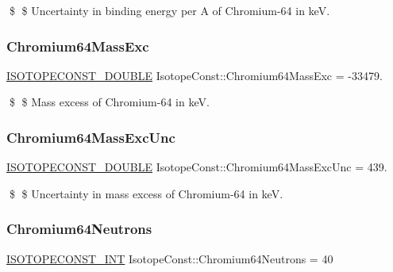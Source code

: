 \$ \$ Uncertainty in binding energy per A of Chromium-\/64 in keV. \mbox{\label{group___isotope_const-_chromium-_cr64_gafe8a8f8202820bf748d16053790a9ca7}} 
\subsubsection{\texorpdfstring{Chromium64\+Mass\+Exc}{Chromium64MassExc}}
{\footnotesize\ttfamily \mbox{\hyperlink{group___isotope_const-_macros_ga8f45a7272ce02c0b4c65c44636ed719a}{I\+S\+O\+T\+O\+P\+E\+C\+O\+N\+S\+T\+\_\+\+D\+O\+U\+B\+LE}} Isotope\+Const\+::\+Chromium64\+Mass\+Exc = -\/33479.}

\$ \$ Mass excess of Chromium-\/64 in keV. \mbox{\label{group___isotope_const-_chromium-_cr64_ga1cd9ef8ffc20773e980f1c568e1cb2d1}} 
\subsubsection{\texorpdfstring{Chromium64\+Mass\+Exc\+Unc}{Chromium64MassExcUnc}}
{\footnotesize\ttfamily \mbox{\hyperlink{group___isotope_const-_macros_ga8f45a7272ce02c0b4c65c44636ed719a}{I\+S\+O\+T\+O\+P\+E\+C\+O\+N\+S\+T\+\_\+\+D\+O\+U\+B\+LE}} Isotope\+Const\+::\+Chromium64\+Mass\+Exc\+Unc = 439.}

\$ \$ Uncertainty in mass excess of Chromium-\/64 in keV. \mbox{\label{group___isotope_const-_chromium-_cr64_ga542cabddc1bf898cc0a3522ef904f6ff}} 
\subsubsection{\texorpdfstring{Chromium64\+Neutrons}{Chromium64Neutrons}}
{\footnotesize\ttfamily \mbox{\hyperlink{group___isotope_const-_macros_ga5f18360b3e99483a35c32d789e62621c}{I\+S\+O\+T\+O\+P\+E\+C\+O\+N\+S\+T\+\_\+\+I\+NT}} Isotope\+Const\+::\+Chromium64\+Neutrons = 40}

